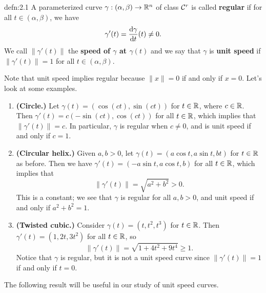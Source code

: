 \begin{defn}{defn:2.1}
    A parameterized curve $\gamma : (\alpha, \beta) \to \mathbb{R}^n$ of class ${\cal C}^r$ is called 
    {\bf regular} if for all $t \in (\alpha, \beta)$, we have 
    \[ \gamma'(t) = \frac{{\rm d}\gamma}{{\rm d}t}(t) \neq 0. \] 
    We call $\|\gamma'(t)\|$ the {\bf speed of $\gamma$ 
    at $\gamma(t)$} and we say that $\gamma$ is {\bf unit speed} if $\|\gamma'(t)\| = 1$ for all 
    $t \in (\alpha, \beta)$. 
\end{defn}\vspace{-0.25cm}
Note that unit speed implies regular because $\|x\| = 0$ if and only if $x = 0$. 
Let's look at some examples. 
\begin{enumerate}[(1)]
    \item {\bf (Circle.)} Let $\gamma(t) = (\cos(ct), \sin(ct))$ for $t \in \mathbb{R}$, 
    where $c \in \mathbb{R}$. Then $\gamma'(t) = c(-\sin(ct), \cos(ct))$ for all $t \in \mathbb{R}$,
    which implies that $\|\gamma'(t)\| = c$. In particular, $\gamma$ is 
    regular when $c \neq 0$, and is unit speed if and only if $c = 1$. 
    
    \item {\bf (Circular helix.)} Given $a, b > 0$, let $\gamma(t) = 
    (a\cos t, a\sin t, bt)$ for $t \in \mathbb{R}$ as before. Then we have $\gamma'(t) = 
    (-a\sin t, a\cos t, b)$ for all $t \in \mathbb{R}$, which implies that 
    \[ \|\gamma'(t)\| = \sqrt{a^2 + b^2} > 0. \] 
    This is a constant; we see that $\gamma$ is regular for all $a, b > 0$, 
    and unit speed if and only if $a^2 + b^2 = 1$. 

    \item {\bf (Twisted cubic.)} Consider $\gamma(t) = (t, t^2, t^3)$ for $t \in \mathbb{R}$. 
    Then $\gamma'(t) = (1, 2t, 3t^2)$ for all $t \in \mathbb{R}$, so 
    \[ \|\gamma'(t)\| = \sqrt{1 + 4t^2 + 9t^4} \geq 1. \] 
    Notice that $\gamma$ is regular, but it is not 
    a unit speed curve since $\|\gamma'(t)\| = 1$ if and only if $t = 0$. 
\end{enumerate}
The following result will be useful in our study of unit speed curves. 

